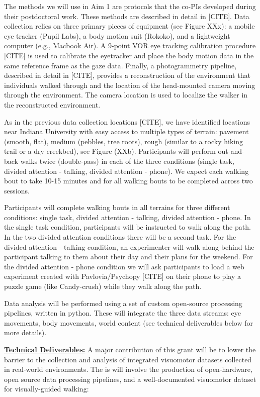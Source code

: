 The methods we will use in Aim 1 are protocols that the co-PIs developed during their postdoctoral work. These methods are described in detail in [CITE]. Data collection relies on three primary pieces of equipment (see Figure XXx): a mobile eye tracker (Pupil Labs), a body motion suit (Rokoko), and a lightweight computer (e.g., Macbook Air). A 9-point VOR eye tracking calibration procedure [CITE] is used to calibrate the eyetracker and place the body motion data in the same reference frame as the gaze data. Finally, a photogrammetry pipeline, described in detail in [CITE], provides a reconstruction of the environment that individuals walked through and the location of the head-mounted camera moving through the environment. The camera location is used to localize the walker in the reconstructed environment.

As in the previous data collection locations [CITE], we have
identified locations near Indiana University with easy access to
multiple types of terrain: pavement (smooth, flat), medium (pebbles, tree roots), rough (similar to a rocky hiking trail or a dry creekbed), see Figure (XXb). Participants will perform out-and-back walks twice (double-pass) in each of the three conditions (single task, divided attention - talking, divided attention - phone). We expect each walking bout to take 10-15 minutes and for all walking bouts to be completed across two sessions.

Participants will complete walking bouts in all terrains for three
different conditions: single task, divided attention - talking, divided attention - phone. In the single task condition, participants will be instructed to walk along the path. In the two divided attention conditions there will be a second task. For the divided attention - talking condition, an experimenter will walk along behind the participant talking to them about their day and their plans for the weekend. For the divided attention - phone condition we will ask participants to load a web experiment created with Pavlovia/Psychopy [CITE] on their phone to play a puzzle game (like Candy-crush) while they walk along the path.

Data analysis will be performed using a set of custom open-source
processing pipelines, written in python. These will integrate the three data streams: eye movements, body movements, world content (see technical deliverables below for more details).

\noindent\underline{\textbf{Technical Deliverables:}} A major contribution of this grant will be to lower the barrier to the collection and analysis of integrated visuomotor datasets collected in real-world environments.  The is will involve the production of open-hardware, open source data processing pipelines, and a well-documented visuomotor dataset for visually-guided walking:

